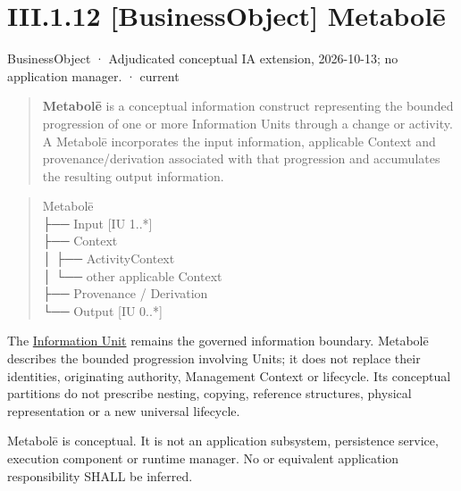 \section*{III.1.12 [BusinessObject] Metabolē}
\label{navigation:III.1.12}

\label{element:c34b4929f71946708d37dbe6c1da920a}
{\small BusinessObject · Adjudicated conceptual IA extension, 2026-10-13; no application manager. · current}\par

\begin{quote}


\textbf{Metabolē} is a conceptual information construct representing the bounded
progression of one or more Information Units through a change or activity.
A Metabolē incorporates the input information, applicable Context and
provenance/derivation associated with that progression and accumulates the
resulting output information.



\end{quote}


\begin{quote}\small\ttfamily
Metabolē\\
 ├── Input       [IU 1..*]\\
 ├── Context\\
 │    ├── ActivityContext\\
 │    └── other applicable Context\\
 ├── Provenance / Derivation\\
 └── Output      [IU 0..*]\\

\end{quote}


The \hyperref[element:10284034c8534b639284386b064f2c54]{Information Unit}
remains the governed information boundary. Metabolē describes the bounded
progression involving Units; it does not replace their identities, originating
authority, Management Context or lifecycle. Its conceptual partitions do not
prescribe nesting, copying, reference structures, physical representation or a
new universal lifecycle.



Metabolē is conceptual. It is not an application subsystem, persistence service,
execution component or runtime manager. No \texttt{} or equivalent
application responsibility SHALL be inferred.



